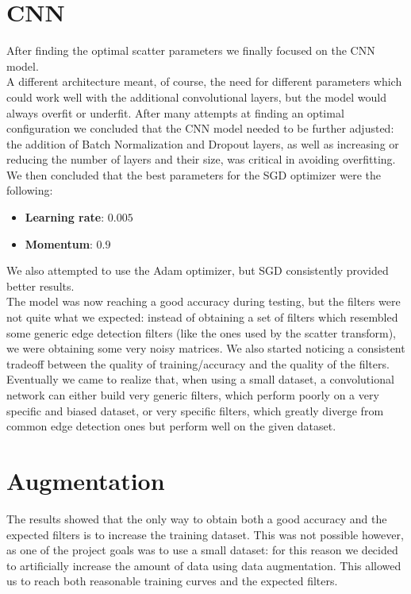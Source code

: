 \documentclass{report}
\begin{document}
\section{CNN}
After finding the optimal scatter parameters we finally focused on the CNN model.\\
A different architecture meant, of course, the need for different parameters which could work well with the additional convolutional layers, but the model would always overfit or underfit.
After many attempts at finding an optimal configuration we concluded that the CNN model needed to be further adjusted: the addition of Batch Normalization and Dropout layers, as well as increasing or reducing the number of layers and their size, was critical in avoiding overfitting.\\
We then concluded that the best parameters for the SGD optimizer were the following:
\begin{itemize}
  \item \textbf{Learning rate}: $0.005$ 
  \item \textbf{Momentum}: $0.9$
\end{itemize}
We also attempted to use the Adam optimizer, but SGD consistently provided better results.\\

The model was now reaching a good accuracy during testing, but the filters were not quite what we expected: instead of obtaining a set of filters which resembled some generic edge detection filters (like the ones used by the scatter transform), we were obtaining some very noisy matrices.
We also started noticing a consistent tradeoff between the quality of training/accuracy and the quality of the filters.
Eventually we came to realize that, when using a small dataset, a convolutional network can either build very generic filters, which perform poorly on a very specific and biased dataset, or very specific filters, which greatly diverge from common edge detection ones but perform well on the given dataset.


\section{Augmentation}
The results showed that the only way to obtain both a good accuracy and the expected filters is to increase the training dataset.
This was not possible however, as one of the project goals was to use a small dataset: for this reason we decided to artificially increase the amount of data using data augmentation.
This allowed us to reach both reasonable training curves and the expected filters.\\
\end{document}
